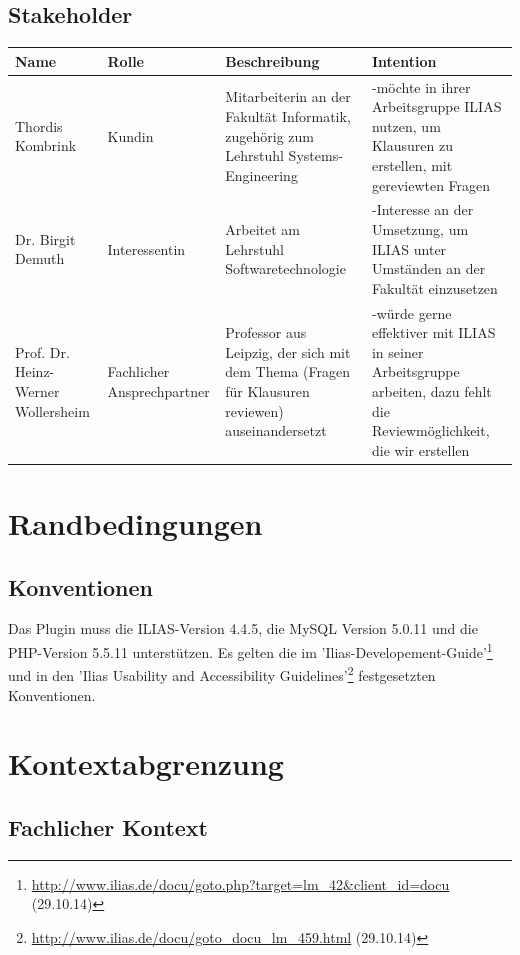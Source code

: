 \documentclass[a4paper]{scrreprt}
\begin{document}
\section{Stakeholder}

\begin{tabular}{|p{3.5cm}|p{2.3cm}|p{3cm}|p{4cm}|}\hline
Name & Rolle & Beschreibung & Intention \\\hline
Thordis Kombrink & Kundin & Mitarbeiterin an der Fakultät Informatik, zugehörig zum Lehrstuhl Systems-Engineering & -möchte in ihrer Arbeitsgruppe ILIAS nutzen, um Klausuren zu erstellen, mit gereviewten Fragen\\\hline
Dr. Birgit Demuth & Interessentin & Arbeitet am Lehrstuhl Softwaretechnologie & -Interesse an der Umsetzung, um ILIAS unter Umständen an der Fakultät einzusetzen\\\hline
Prof. Dr. Heinz-Werner Wollersheim & Fachlicher Ansprechpartner & Professor aus Leipzig, der sich mit dem Thema (Fragen für Klausuren reviewen) auseinandersetzt & -würde gerne effektiver mit ILIAS in seiner Arbeitsgruppe arbeiten, dazu fehlt die Reviewmöglichkeit, die wir erstellen\\\hline
\end{tabular}

\chapter{Randbedingungen}

\section{Konventionen} 

Das Plugin muss die ILIAS-Version 4.4.5, die MySQL Version 5.0.11 und die PHP-Version 5.5.11 unterstützen.
Es gelten die im 'Ilias-Developement-Guide'\footnote{\url{http://www.ilias.de/docu/goto.php?target=lm_42&client_id=docu} (29.10.14)} und in den 'Ilias Usability and Accessibility Guidelines'\footnote{\url{http://www.ilias.de/docu/goto_docu_lm_459.html} (29.10.14)} festgesetzten Konventionen.

\chapter{Kontextabgrenzung}

\section{Fachlicher Kontext}
\end{document}
